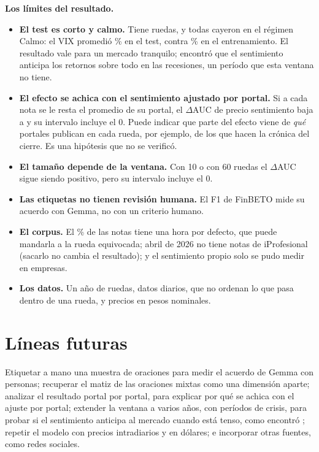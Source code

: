 \textbf{Los límites del resultado.}
\begin{itemize}
  \item \textbf{El test es corto y calmo.} Tiene  ruedas, y todas cayeron en
        el régimen Calmo: el VIX promedió \% en el test, contra
        \% en el entrenamiento. El resultado vale para un mercado
        tranquilo; \citet{garcia2013} encontró que el sentimiento anticipa los retornos sobre todo
        en las recesiones, un período que esta ventana no tiene.
  \item \textbf{El efecto se achica con el sentimiento ajustado por portal.} Si a cada nota se le
        resta el promedio de su portal, el $\Delta$AUC de precio \flecha{} sentimiento baja a
         y su intervalo incluye el 0.
        Puede indicar que parte del efecto viene de \textit{qué} portales publican en cada rueda,
        por ejemplo, de los que hacen la crónica del cierre. Es una hipótesis que no se verificó.
  \item \textbf{El tamaño depende de la ventana.} Con 10 o con 60 ruedas el $\Delta$AUC sigue
        siendo positivo, pero su intervalo incluye el 0.
  \item \textbf{Las etiquetas no tienen revisión humana.} El F1 de FinBETO mide su acuerdo con Gemma,
        no con un criterio humano.
  \item \textbf{El corpus.} El \% de las notas tiene una hora
        por defecto, que puede mandarla a la rueda equivocada; abril de 2026 no tiene notas de
        iProfesional (sacarlo no cambia el resultado); y el sentimiento propio solo se pudo medir
        en  empresas.
  \item \textbf{Los datos.} Un año de ruedas, datos diarios, que no ordenan lo que pasa dentro de
        una rueda, y precios en pesos nominales.
\end{itemize}

\section{Líneas futuras}

Etiquetar a mano una muestra de oraciones para medir el acuerdo de Gemma con personas; recuperar el
matiz de las oraciones mixtas como una dimensión aparte; analizar el resultado portal por portal,
para explicar por qué se achica con el ajuste por portal; extender la ventana a varios años, con
períodos de crisis, para probar si el sentimiento anticipa al mercado cuando está tenso, como
encontró \citet{garcia2013}; repetir el modelo con precios intradiarios y en dólares; e incorporar
otras fuentes, como redes sociales.
